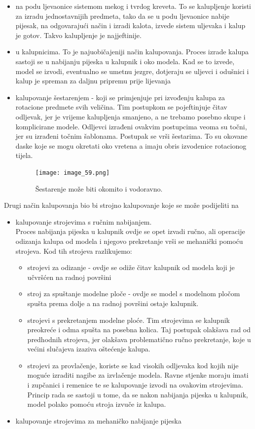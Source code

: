 \documentclass[a4paper,12pt]{article}
\numberwithin{figure}{section}
\begin{document}
\begin{itemize}
\item na podu ljevaonice sistemom mekog i tvrdog kreveta. To se kalupljenje koristi za izradu jednostavnijih predmeta, tako da se u podu ljevaonice nabije pijesak, na odgovarajući način i izradi kalota, izvede sistem uljevaka i kalup je gotov. Takvo kalupljenje je najjeftinije.
\item u kalupnicima. To je najuobičajeniji način kalupovanja. Proces izrade kalupa sastoji se u nabijanju pijeska u kalupnik i oko modela. Kad se to izvede, model se izvodi, eventualno se umetnu jezgre, dotjeraju se uljevci i odušnici i kalup je spreman za daljnu pripremu prije lijevanja
\item kalupovanje šestarenjem - koji se primjenjuje pri izvođenju kalupa za rotacione predmete svih veličina. Tim postupkom se pojeftinjuje čitav odljevak, jer je vrijeme kalupljenja smanjeno, a ne trebamo posebno skupe i komplicirane modele. Odljevci izrađeni ovakvim postupcima veoma su točni, jer su izrađeni točnim šablonama. Postupak se vrši šestarima. To su okovane daske koje se mogu okretati oko vretena a imaju obris izvodenice rotacionog tijela.
\begin{figure}[!h]
\centering
\texttt{[image: image\_59.png]}
\caption{Šestarenje može biti okomito i vodoravno.}
\end{figure}
\FloatBarrier
\end{itemize}
Drugi način kalupovanja bio bi strojno kalupovanje koje se može podijeliti na
\begin{itemize}
\item kalupovanje strojevima s ručnim nabijanjem.\\
Proces nabijanja pijeska u kalupnik ovdje se opet izvadi ručno, ali operacije odizanja kalupa od modela i njegovo prekretanje vrši se mehanički pomoću strojeva. Kod tih strojeva razlikujemo:
\begin{itemize}
\item strojevi za odizanje - ovdje se odiže čitav kalupnik od modela koji je učvršćen na radnoj površini
\item stroj za spuštanje modelne ploče - ovdje se model s modelnom pločom spušta prema dolje a na radnoj površini ostaje kalupnik.
\item strojevi s prekretanjem modelne ploće. Tim strojevima se kalupnik preokreće i odma spušta na posebna kolica. Taj postupak olakšava rad od predhodnih strojeva, jer olakšava problematično ručno prekretanje, koje u većini slučajeva izaziva oštećenje kalupa.
\item strojevi za provlačenje, koriste se kad visokih odljevaka kod kojih nije moguće izraditi nagibe za izvlačenje modela. Ravne stjenke moraju imati i zupčanici i remenice te se kalupovanje izvodi na ovakovim strojevima. Princip rada se sastoji u tome, da se nakon nabijanja pijeska u kalupnik, model polako pomoću stroja izvuče iz kalupa.
\end{itemize}
\item kalupovanje strojevima za mehaničko nabijanje pijeska
\end{itemize}
\end{document}
